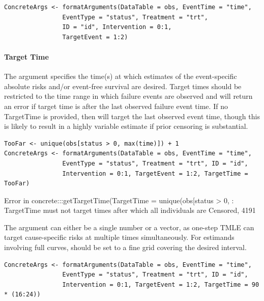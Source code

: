 \documentclass{report}
\newcommand{\1}{\ensuremath{\mathbf{1}}}
\begin{document}
\begin{lstlisting}
ConcreteArgs <- formatArguments(DataTable = obs, EventTime = "time",
				EventType = "status", Treatment = "trt",
				ID = "id", Intervention = 0:1,
				TargetEvent = 1:2)
\end{lstlisting}

\paragraph{Target Time}
\label{TargetTime}
The  argument specifies the time(s) at which estimates of the event-specific absolute risks and/or event-free survival are desired. Target times should be restricted to the time range in which failure events are observed and  will return an error if target time is after the last observed failure event time. If no TargetTime is provided, then  will target the last observed event time, though this is likely to result in a highly variable estimate if prior censoring is substantial. 

\begin{lstlisting}
TooFar <- unique(obs[status > 0, max(time)]) + 1
ConcreteArgs <- formatArguments(DataTable = obs, EventTime = "time",
				EventType = "status", Treatment = "trt", ID = "id", 
				Intervention = 0:1, TargetEvent = 1:2, TargetTime = TooFar)
\end{lstlisting}

Error in concrete:::getTargetTime(TargetTime = unique(obs[status > 0,  : 
  TargetTime must not target times after which all individuals are Censored, 4191

The  argument can either be a single number or a vector, as one-step TMLE can target cause-specific risks at multiple times simultaneously. For estimands involving full curves,  should be set to a fine grid covering the desired interval. 

\begin{lstlisting}
ConcreteArgs <- formatArguments(DataTable = obs, EventTime = "time",
				EventType = "status", Treatment = "trt", ID = "id", 
				Intervention = 0:1, TargetEvent = 1:2, TargetTime = 90 * (16:24))
\end{lstlisting}
\end{document}

